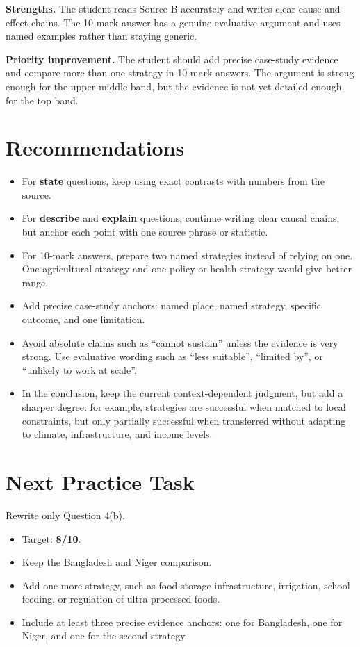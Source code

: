 \documentclass[11pt,a4paper]{article}
\newcommand{\term}[1]{\textcolor{HeadingBlue}{\textbf{#1}}}
\newcommand{\score}[1]{\textcolor{AccentTeal}{\textbf{#1}}}
\newcommand{\boxnote}[3]{%
\noindent\colorbox{#1}{%
  \begin{minipage}{0.965\textwidth}
  \sffamily
  \textbf{\textcolor{HeadingBlue}{#2}} #3
  \end{minipage}
}}
\begin{document}
\boxnote{SoftGreen}{Strengths.}{The student reads Source B accurately and
writes clear cause-and-effect chains. The 10-mark answer has a genuine
evaluative argument and uses named examples rather than staying generic.}

\boxnote{SoftGold}{Priority improvement.}{The student should add precise
case-study evidence and compare more than one strategy in 10-mark answers. The
argument is strong enough for the upper-middle band, but the evidence is not yet
detailed enough for the top band.}

\section{Recommendations}

\begin{itemize}
  \item For \term{state} questions, keep using exact contrasts with numbers
  from the source.
  \item For \term{describe} and \term{explain} questions, continue writing
  clear causal chains, but anchor each point with one source phrase or statistic.
  \item For 10-mark answers, prepare two named strategies instead of relying on
  one. One agricultural strategy and one policy or health strategy would give
  better range.
  \item Add precise case-study anchors: named place, named strategy, specific
  outcome, and one limitation.
  \item Avoid absolute claims such as ``cannot sustain'' unless the evidence is
  very strong. Use evaluative wording such as ``less suitable'', ``limited by'',
  or ``unlikely to work at scale''.
  \item In the conclusion, keep the current context-dependent judgment, but add
  a sharper degree: for example, strategies are successful when matched to
  local constraints, but only partially successful when transferred without
  adapting to climate, infrastructure, and income levels.
\end{itemize}

\section{Next Practice Task}

Rewrite only Question 4(b).

\begin{itemize}
  \item Target: \score{8/10}.
  \item Keep the Bangladesh and Niger comparison.
  \item Add one more strategy, such as food storage infrastructure,
  irrigation, school feeding, or regulation of ultra-processed foods.
  \item Include at least three precise evidence anchors: one for Bangladesh,
  one for Niger, and one for the second strategy.
\end{itemize}
\end{document}
